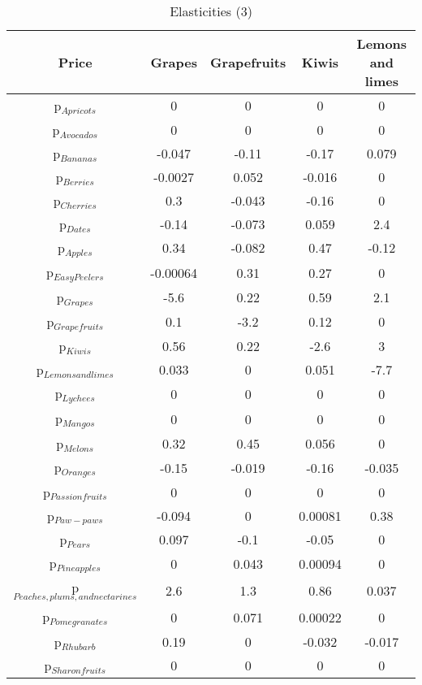 \documentclass[11pt]{article}
\begin{document}
\begin{table}[h]
\caption{Elasticities (3)}
\label{Table: elasticities 3}
\begin{center}
\begin{tabular}{ccccc}
Price & Grapes & Grapefruits & Kiwis & Lemons and limes \\ \hline
p$_{Apricots}$ & 0 & 0 & 0 & 0 \\ 
p$_{Avocados}$ & 0 & 0 & 0 & 0 \\ 
p$_{Bananas}$ & -0.047 & -0.11 & -0.17 & 0.079 \\ 
p$_{Berries}$ & -0.0027 & 0.052 & -0.016 & 0 \\ 
p$_{Cherries}$ & 0.3 & -0.043 & -0.16 & 0 \\ 
p$_{Dates}$ & -0.14 & -0.073 & 0.059 & 2.4 \\ 
p$_{Apples}$ & 0.34 & -0.082 & 0.47 & -0.12 \\ 
p$_{Easy Peelers}$ & -0.00064 & 0.31 & 0.27 & 0 \\ 
p$_{Grapes}$ & -5.6 & 0.22 & 0.59 & 2.1 \\ 
p$_{Grapefruits}$ & 0.1 & -3.2 & 0.12 & 0 \\ 
p$_{Kiwis}$ & 0.56 & 0.22 & -2.6 & 3 \\ 
p$_{Lemons and limes}$ & 0.033 & 0 & 0.051 & -7.7 \\ 
p$_{Lychees}$ & 0 & 0 & 0 & 0 \\ 
p$_{Mangos}$ & 0 & 0 & 0 & 0 \\ 
p$_{Melons}$ & 0.32 & 0.45 & 0.056 & 0 \\ 
p$_{Oranges}$ & -0.15 & -0.019 & -0.16 & -0.035 \\ 
p$_{Passion fruits}$ & 0 & 0 & 0 & 0 \\ 
p$_{Paw-paws}$ & -0.094 & 0 & 0.00081 & 0.38 \\ 
p$_{Pears}$ & 0.097 & -0.1 & -0.05 & 0 \\ 
p$_{Pineapples}$ & 0 & 0.043 & 0.00094 & 0 \\ 
p$_{Peaches, plums, and nectarines}$ & 2.6 & 1.3 & 0.86 & 0.037 \\ 
p$_{Pomegranates}$ & 0 & 0.071 & 0.00022 & 0 \\ 
p$_{Rhubarb}$ & 0.19 & 0 & -0.032 & -0.017 \\ 
p$_{Sharon fruits}$ & 0 & 0 & 0 & 0 \\ 
\end{tabular}
\end{center}
\end{table}
\end{document}
